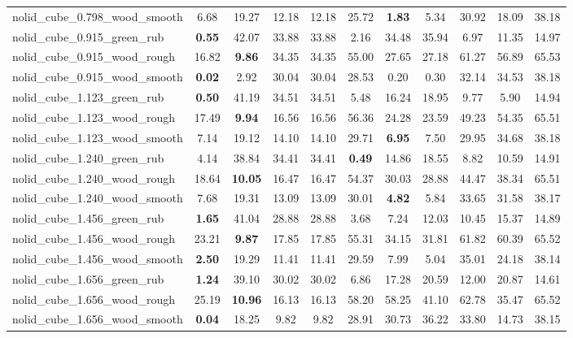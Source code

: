 \begin{table}[H]
{\begin{tabular}{l cccccccccc}
        nolid\_cube\_0.798\_wood\_smooth & 6.68 & 19.27 & 12.18 & 12.18 & 25.72 & \textbf{1.83} & 5.34 & 30.92 & 18.09 & 38.18 \\
        nolid\_cube\_0.915\_green\_rub & \textbf{0.55} & 42.07 & 33.88 & 33.88 & 2.16 & 34.48 & 35.94 & 6.97 & 11.35 & 14.97 \\
        nolid\_cube\_0.915\_wood\_rough & 16.82 & \textbf{9.86} & 34.35 & 34.35 & 55.00 & 27.65 & 27.18 & 61.27 & 56.89 & 65.53 \\
        nolid\_cube\_0.915\_wood\_smooth & \textbf{0.02} & 2.92 & 30.04 & 30.04 & 28.53 & 0.20 & 0.30 & 32.14 & 34.53 & 38.18 \\
        nolid\_cube\_1.123\_green\_rub & \textbf{0.50} & 41.19 & 34.51 & 34.51 & 5.48 & 16.24 & 18.95 & 9.77 & 5.90 & 14.94 \\
        nolid\_cube\_1.123\_wood\_rough & 17.49 & \textbf{9.94} & 16.56 & 16.56 & 56.36 & 24.28 & 23.59 & 49.23 & 54.35 & 65.51 \\
        nolid\_cube\_1.123\_wood\_smooth & 7.14 & 19.12 & 14.10 & 14.10 & 29.71 & \textbf{6.95} & 7.50 & 29.95 & 34.68 & 38.18 \\
        nolid\_cube\_1.240\_green\_rub & 4.14 & 38.84 & 34.41 & 34.41 & \textbf{0.49} & 14.86 & 18.55 & 8.82 & 10.59 & 14.91 \\
        nolid\_cube\_1.240\_wood\_rough & 18.64 & \textbf{10.05} & 16.47 & 16.47 & 54.37 & 30.03 & 28.88 & 44.47 & 38.34 & 65.51 \\
        nolid\_cube\_1.240\_wood\_smooth & 7.68 & 19.31 & 13.09 & 13.09 & 30.01 & \textbf{4.82} & 5.84 & 33.65 & 31.58 & 38.17 \\
        nolid\_cube\_1.456\_green\_rub & \textbf{1.65} & 41.04 & 28.88 & 28.88 & 3.68 & 7.24 & 12.03 & 10.45 & 15.37 & 14.89 \\
        nolid\_cube\_1.456\_wood\_rough & 23.21 & \textbf{9.87} & 17.85 & 17.85 & 55.31 & 34.15 & 31.81 & 61.82 & 60.39 & 65.52 \\
        nolid\_cube\_1.456\_wood\_smooth & \textbf{2.50} & 19.29 & 11.41 & 11.41 & 29.59 & 7.99 & 5.04 & 35.01 & 24.18 & 38.14 \\
        nolid\_cube\_1.656\_green\_rub & \textbf{1.24} & 39.10 & 30.02 & 30.02 & 6.86 & 17.28 & 20.59 & 12.00 & 20.87 & 14.61 \\
        nolid\_cube\_1.656\_wood\_rough & 25.19 & \textbf{10.96} & 16.13 & 16.13 & 58.20 & 58.25 & 41.10 & 62.78 & 35.47 & 65.52 \\
        nolid\_cube\_1.656\_wood\_smooth & \textbf{0.04} & 18.25 & 9.82 & 9.82 & 28.91 & 30.73 & 36.22 & 33.80 & 14.73 & 38.15 \\

\end{tabular}}
\end{table}
